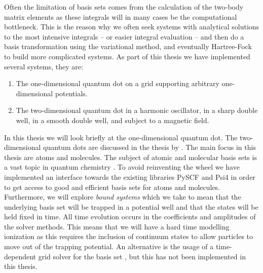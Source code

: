     Often the limitation of basis sets comes from the calculation of the
    two-body matrix elements as these integrals will in many cases be the
    computational bottleneck.
    This is the reason why we often seek systems with analytical solutions to
    the most intensive integrals -- or easier integral evaluation -- and then do
    a basis transformation using the variational method, and eventually
    Hartree-Fock to build more complicated systems.
    As part of this thesis we have implemented several systems, they are:
    \begin{enumerate}
        \item The one-dimensional quantum dot on a grid supporting arbitrary
            one-dimensional potentials.
        \item The two-dimensional quantum dot in a harmonic oscillator, in a
            sharp double well, in a smooth double well, and subject to a
            magnetic field.
    \end{enumerate}
    In this thesis we will look briefly at the one-dimensional quantum dot.
    The two-dimensional quantum dots are discussed in the thesis by
    \citeauthor{greg-winther} \cite{greg-winther}.
    The main focus in this thesis are atoms and molecules.
    The subject of atomic and molecular basis sets is a vast topic in quantum
    chemistry \cite{helgaker-molecular}.
    To avoid reinventing the wheel we have implemented an interface towards the
    existing libraries PySCF \cite{pyscf} and Psi4 \cite{psi4} in order to get
    access to good and efficient basis sets for atoms and molecules.
    Furthermore, we will explore \emph{bound systems} which we take to mean that
    the underlying basis set will be trapped in a potential well and that the
    states will be held fixed in time.
    All time evolution occurs in the coefficients and amplitudes of the solver
    methods.
    This means that we will have a hard time modelling ionization as this
    requires the inclusion of continuum states to allow particles to move out of
    the trapping potential.
    An alternative is the usage of a time-dependent grid solver for the basis
    set \cite{miyagi_and_madsen}, but this has not been implemented in this
    thesis.


    

